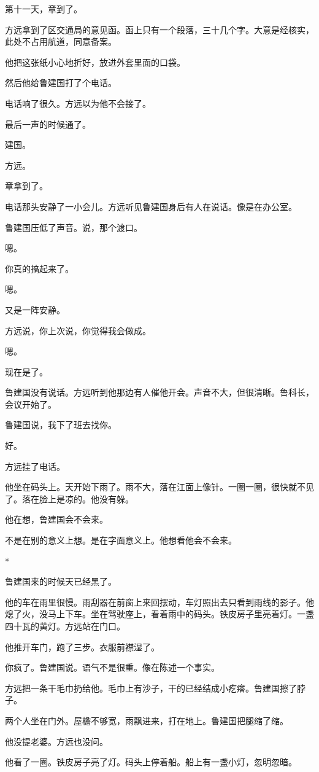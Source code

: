 \documentclass[UTF8,a5paper,11pt,openany]{ctexbook}
\newcommand{\scene}{\vspace{1em}\begin{center}*\quad*\quad*\end{center}\vspace{0.5em}}
\begin{document}
第十一天，章到了。

方远拿到了区交通局的意见函。函上只有一个段落，三十几个字。大意是经核实，此处不占用航道，同意备案。

他把这张纸小心地折好，放进外套里面的口袋。

然后他给鲁建国打了个电话。

电话响了很久。方远以为他不会接了。

最后一声的时候通了。

建国。

方远。

章拿到了。

电话那头安静了一小会儿。方远听见鲁建国身后有人在说话。像是在办公室。

鲁建国压低了声音。说，那个渡口。

嗯。

你真的搞起来了。

嗯。

又是一阵安静。

方远说，你上次说，你觉得我会做成。

嗯。

现在是了。

鲁建国没有说话。方远听到他那边有人催他开会。声音不大，但很清晰。鲁科长，会议开始了。

鲁建国说，我下了班去找你。

好。

方远挂了电话。

他坐在码头上。天开始下雨了。雨不大，落在江面上像针。一圈一圈，很快就不见了。落在脸上是凉的。他没有躲。

他在想，鲁建国会不会来。

不是在别的意义上想。是在字面意义上。他想看他会不会来。


\scene

鲁建国来的时候天已经黑了。

他的车在雨里很慢。雨刮器在前窗上来回摆动，车灯照出去只看到雨线的影子。他熄了火，没马上下车。坐在驾驶座上，看着雨中的码头。铁皮房子里亮着灯。一盏四十瓦的黄灯。方远站在门口。

他推开车门，跑了三步。衣服前襟湿了。

你疯了。鲁建国说。语气不是很重。像在陈述一个事实。

方远把一条干毛巾扔给他。毛巾上有沙子，干的已经结成小疙瘩。鲁建国擦了脖子。

两个人坐在门外。屋檐不够宽，雨飘进来，打在地上。鲁建国把腿缩了缩。

他没提老婆。方远也没问。

他看了一圈。铁皮房子亮了灯。码头上停着船。船上有一盏小灯，忽明忽暗。
\end{document}
